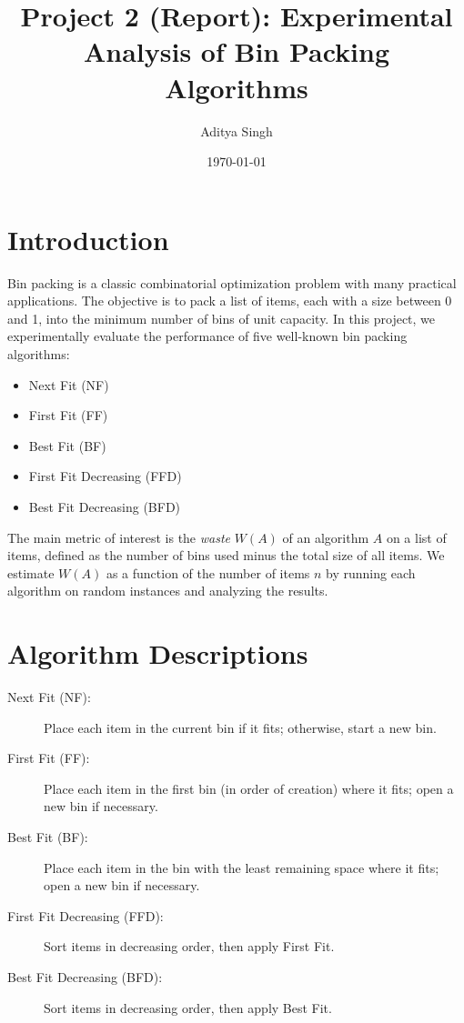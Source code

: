 \documentclass[12pt]{article}
\title{Project 2 (Report): Experimental Analysis of Bin Packing Algorithms}
\author{Aditya Singh}
\date{\today}
\begin{document}
\maketitle

\section{Introduction}
Bin packing is a classic combinatorial optimization problem with many practical applications. The objective is to pack a list of items, each with a size between 0 and 1, into the minimum number of bins of unit capacity. In this project, we experimentally evaluate the performance of five well-known bin packing algorithms:
\begin{itemize}
    \item Next Fit (NF)
    \item First Fit (FF)
    \item Best Fit (BF)
    \item First Fit Decreasing (FFD)
    \item Best Fit Decreasing (BFD)
\end{itemize}

The main metric of interest is the \emph{waste} $W(A)$ of an algorithm $A$ on a list of items, defined as the number of bins used minus the total size of all items. We estimate $W(A)$ as a function of the number of items $n$ by running each algorithm on random instances and analyzing the results.

\section{Algorithm Descriptions}
\begin{description}
    \item[Next Fit (NF):] Place each item in the current bin if it fits; otherwise, start a new bin.
    \item[First Fit (FF):] Place each item in the first bin (in order of creation) where it fits; open a new bin if necessary.
    \item[Best Fit (BF):] Place each item in the bin with the least remaining space where it fits; open a new bin if necessary.
    \item[First Fit Decreasing (FFD):] Sort items in decreasing order, then apply First Fit.
    \item[Best Fit Decreasing (BFD):] Sort items in decreasing order, then apply Best Fit.
\end{description}
\end{document}
